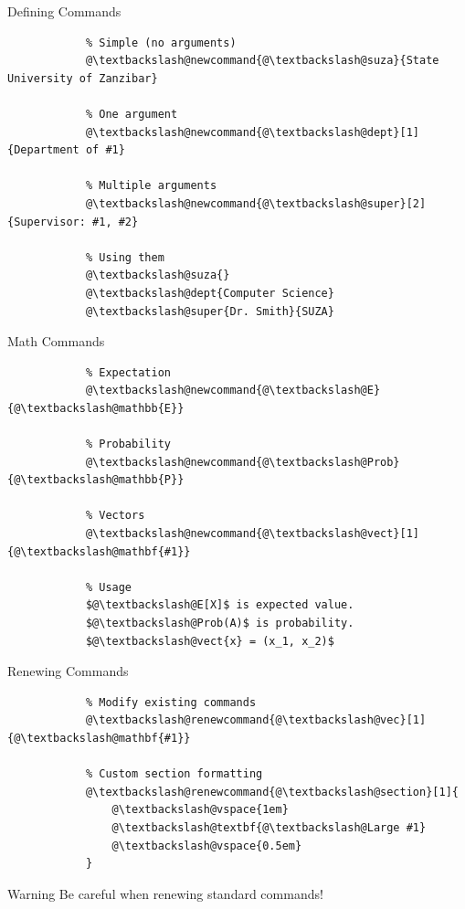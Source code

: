 \documentclass[aspectratio=169]{beamer}
\begin{document}
	\begin{frame}[fragile]{Defining Commands}
		\begin{lstlisting}
			% Simple (no arguments)
			@\textbackslash@newcommand{@\textbackslash@suza}{State University of Zanzibar}
			
			% One argument
			@\textbackslash@newcommand{@\textbackslash@dept}[1]{Department of #1}
			
			% Multiple arguments
			@\textbackslash@newcommand{@\textbackslash@super}[2]{Supervisor: #1, #2}
			
			% Using them
			@\textbackslash@suza{}
			@\textbackslash@dept{Computer Science}
			@\textbackslash@super{Dr. Smith}{SUZA}
		\end{lstlisting}
	\end{frame}
	
	\begin{frame}[fragile]{Math Commands}
		\begin{lstlisting}
			% Expectation
			@\textbackslash@newcommand{@\textbackslash@E}{@\textbackslash@mathbb{E}}
			
			% Probability
			@\textbackslash@newcommand{@\textbackslash@Prob}{@\textbackslash@mathbb{P}}
			
			% Vectors
			@\textbackslash@newcommand{@\textbackslash@vect}[1]{@\textbackslash@mathbf{#1}}
			
			% Usage
			$@\textbackslash@E[X]$ is expected value.
			$@\textbackslash@Prob(A)$ is probability.
			$@\textbackslash@vect{x} = (x_1, x_2)$
		\end{lstlisting}
	\end{frame}
	
	\begin{frame}[fragile]{Renewing Commands}
		\begin{lstlisting}
			% Modify existing commands
			@\textbackslash@renewcommand{@\textbackslash@vec}[1]{@\textbackslash@mathbf{#1}}
			
			% Custom section formatting
			@\textbackslash@renewcommand{@\textbackslash@section}[1]{
				@\textbackslash@vspace{1em}
				@\textbackslash@textbf{@\textbackslash@Large #1}
				@\textbackslash@vspace{0.5em}
			}
		\end{lstlisting}
		
		\begin{alertblock}{Warning}
			Be careful when renewing standard commands!
		\end{alertblock}
	\end{frame}
	
\end{document}
